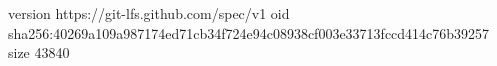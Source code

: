 version https://git-lfs.github.com/spec/v1
oid sha256:40269a109a987174ed71cb34f724e94c08938cf003e33713fccd414c76b39257
size 43840
